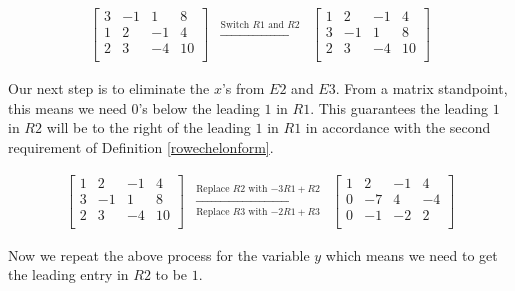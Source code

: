 \begin{ex}
\[\begin{array}{ccc}
\left[ \begin{array}{rrr|r} 
3 & -1 & 1 & 8 \\ 
1 & 2 & -1 & 4 \\ 
2 & 3 & -4 & 10 \\ 
\end{array} \right]

& 

\xrightarrow{\text{Switch $R1$ and $R2$}}

&

\left[ \begin{array}{rrr|r}
1 & 2 & -1 & 4 \\  
3 & -1 & 1 & 8 \\ 
2 & 3 & -4 & 10 \\ 
\end{array} \right]


\end{array}\]



Our next step is to eliminate the $x$'s from $E2$ and $E3$.  From a matrix standpoint, this means we need $0$'s below the leading $1$ in $R1$.  This guarantees the leading $1$ in $R2$ will be to the right of the leading $1$ in $R1$ in accordance with the second requirement of Definition \ref{rowechelonform}.

\[\begin{array}{ccc}

\left[ \begin{array}{rrr|r}
1 & 2 & -1 & 4 \\  
3 & -1 & 1 & 8 \\ 
2 & 3 & -4 & 10 \\ 
\end{array} \right]
&
\xrightarrow[\text{Replace $R3$ with $-2R1+R3$}]{\text{Replace $R2$ with $-3R1 +R2$}} 
&
\left[ \begin{array}{rrr|r}  
1 & 2 & -1 & 4 \\  
0 & -7 & 4 & -4 \\ 
0 & -1 & -2  & 2 \\ 
\end{array} \right]



\end{array}\]

Now we repeat the above process for the variable $y$ which means we need to get the leading entry in $R2$ to be $1$.

\[\begin{array}{ccc}


\end{array}\]
\end{ex}
